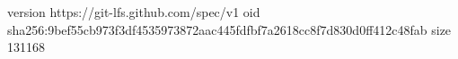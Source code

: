 version https://git-lfs.github.com/spec/v1
oid sha256:9bef55cb973f3df4535973872aac445fdfbf7a2618cc8f7d830d0ff412c48fab
size 131168
